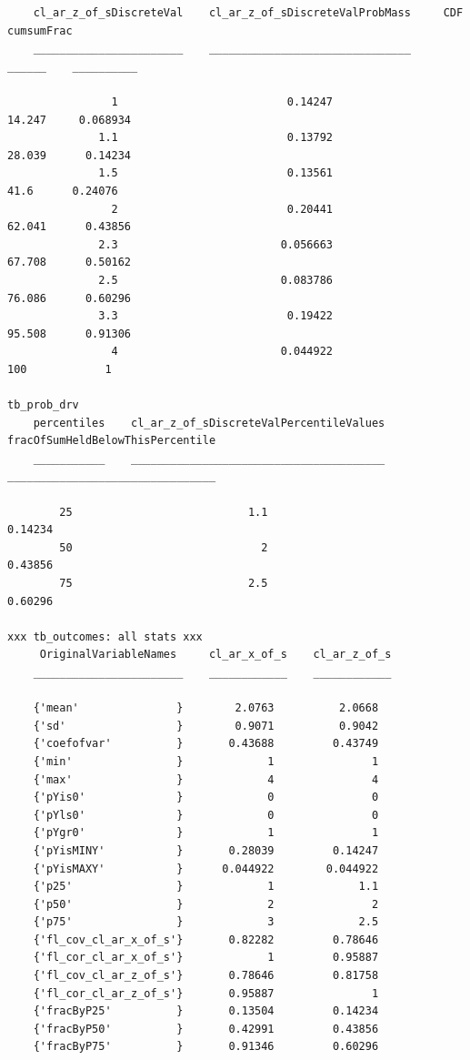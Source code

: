\documentclass[
]{book}
\begin{document}
\begin{verbatim}
    cl_ar_z_of_sDiscreteVal    cl_ar_z_of_sDiscreteValProbMass     CDF      cumsumFrac
    _______________________    _______________________________    ______    __________

                1                          0.14247                14.247     0.068934 
              1.1                          0.13792                28.039      0.14234 
              1.5                          0.13561                  41.6      0.24076 
                2                          0.20441                62.041      0.43856 
              2.3                         0.056663                67.708      0.50162 
              2.5                         0.083786                76.086      0.60296 
              3.3                          0.19422                95.508      0.91306 
                4                         0.044922                   100            1 

tb_prob_drv
    percentiles    cl_ar_z_of_sDiscreteValPercentileValues    fracOfSumHeldBelowThisPercentile
    ___________    _______________________________________    ________________________________

        25                           1.1                                  0.14234             
        50                             2                                  0.43856             
        75                           2.5                                  0.60296             

xxx tb_outcomes: all stats xxx
     OriginalVariableNames     cl_ar_x_of_s    cl_ar_z_of_s
    _______________________    ____________    ____________

    {'mean'               }        2.0763          2.0668  
    {'sd'                 }        0.9071          0.9042  
    {'coefofvar'          }       0.43688         0.43749  
    {'min'                }             1               1  
    {'max'                }             4               4  
    {'pYis0'              }             0               0  
    {'pYls0'              }             0               0  
    {'pYgr0'              }             1               1  
    {'pYisMINY'           }       0.28039         0.14247  
    {'pYisMAXY'           }      0.044922        0.044922  
    {'p25'                }             1             1.1  
    {'p50'                }             2               2  
    {'p75'                }             3             2.5  
    {'fl_cov_cl_ar_x_of_s'}       0.82282         0.78646  
    {'fl_cor_cl_ar_x_of_s'}             1         0.95887  
    {'fl_cov_cl_ar_z_of_s'}       0.78646         0.81758  
    {'fl_cor_cl_ar_z_of_s'}       0.95887               1  
    {'fracByP25'          }       0.13504         0.14234  
    {'fracByP50'          }       0.42991         0.43856  
    {'fracByP75'          }       0.91346         0.60296
\end{verbatim}
\end{document}
